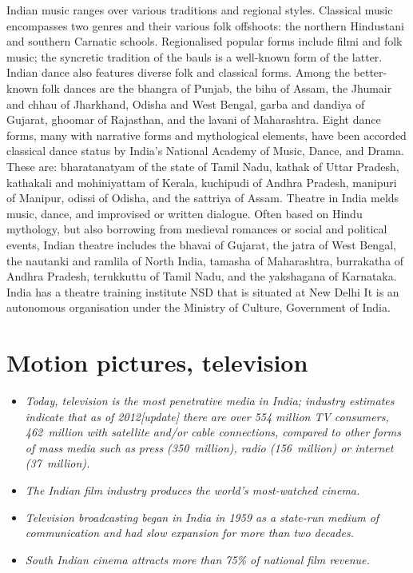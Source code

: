 Indian music ranges over various traditions and regional styles.
Classical music encompasses two genres and their various folk offshoots:
the northern Hindustani and southern Carnatic schools. Regionalised
popular forms include filmi and folk music; the syncretic tradition of
the bauls is a well-known form of the latter. Indian dance also features
diverse folk and classical forms. Among the better-known folk dances are
the bhangra of Punjab, the bihu of Assam, the Jhumair and chhau of
Jharkhand, Odisha and West Bengal, garba and dandiya of Gujarat, ghoomar
of Rajasthan, and the lavani of Maharashtra. Eight dance forms, many
with narrative forms and mythological elements, have been accorded
classical dance status by India's National Academy of Music, Dance, and
Drama. These are: bharatanatyam of the state of Tamil Nadu, kathak of
Uttar Pradesh, kathakali and mohiniyattam of Kerala, kuchipudi of Andhra
Pradesh, manipuri of Manipur, odissi of Odisha, and the sattriya of
Assam. Theatre in India melds music, dance, and improvised or written
dialogue. Often based on Hindu mythology, but also borrowing from
medieval romances or social and political events, Indian theatre
includes the bhavai of Gujarat, the jatra of West Bengal, the nautanki
and ramlila of North India, tamasha of Maharashtra, burrakatha of Andhra
Pradesh, terukkuttu of Tamil Nadu, and the yakshagana of Karnataka.
India has a theatre training institute NSD that is situated at New Delhi
It is an autonomous organisation under the Ministry of Culture,
Government of India.

\section{Motion pictures, television}\label{motion-pictures-television}

\begin{itemize}
\item
  \emph{Today, television is the most penetrative media in India;
  industry estimates indicate that as of 2012{[}update{]} there are over
  554 million TV consumers, 462~million with satellite and/or cable
  connections, compared to other forms of mass media such as press
  (350~million), radio (156~million) or internet (37~million).}
\item
  \emph{The Indian film industry produces the world's most-watched
  cinema.}
\item
  \emph{Television broadcasting began in India in 1959 as a state-run
  medium of communication and had slow expansion for more than two
  decades.}
\item
  \emph{South Indian cinema attracts more than 75\% of national film
  revenue.}
\end{itemize}

